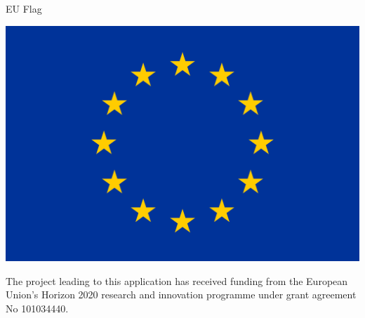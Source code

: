 \documentclass{beamer}
\begin{document}
\begin{frame}{EU Flag} 
\begin{center}
\includegraphics[scale=0.1]{pictures/euflag.png}

The project leading to this application has received funding from the
European Union's Horizon 2020 research and innovation programme under grant agreement No
101034440.
\end{center}
\end{frame}
\end{document}

